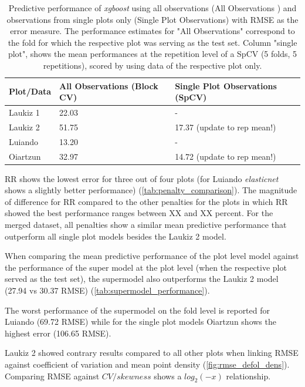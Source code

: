\documentclass[review]{elsarticle}
\begin{document}
\begin{table}[t!]
\centering
\caption[t]{Predictive performance of \textit{xgboost} using all observations (All Observations ) and observations from single plots only (Single Plot Observations) with \ac{RMSE} as the error measure. The performance estimates for "All Observations" correspond to the fold for which the respective plot was serving as the test set. Column "single plot", shows the mean performances at the repetition level of a SpCV (5 folds, 5 repetitions), scored by using data of the respective plot only.}
\begingroup\footnotesize
\begin{tabular}{lll}
	\\
	Plot/Data & All Observations (Block CV) & Single Plot Observations (SpCV)             \\
	\hline
	Laukiz 1  & 22.03                & -                              \\
	Laukiz 2  & 51.75                & 17.37  (update to rep mean!)   \\
	Luiando   & 13.20                & -                              \\
	Oiartzun  & 32.97                & 14.72    (update to rep mean!) \\
	\bottomrule
\end{tabular}
\endgroup
\label{tab:supermodel_performance}
\end{table}

\ac{RR} shows the lowest error for three out of four plots (for Luiando \textit{elasticnet} shows a slightly better performance) (\autoref{tab:penalty_comparison}).
The magnitude of difference for \ac{RR} compared to the other penalties for the plots in which \ac{RR} showed the best performance ranges between XX and XX percent.
For the merged dataset, all penalties show a similar mean predictive performance that outperform all single plot models besides the Laukiz 2 model.

When comparing the mean predictive performance of the plot level model against the performance of the super model at the plot level (when the respective plot served as the test set), the supermodel also outperforms the Laukiz 2 model (27.94 vs 30.37 RMSE) (\autoref{tab:supermodel_performance}).

The worst performance of the supermodel on the fold level is reported for Luiando (69.72 RMSE) while for the single plot models Oiartzun shows the highest error (106.65 RMSE).

Laukiz 2 showed contrary results compared to all other plots when linking \ac{RMSE} against coefficient of variation and mean point density (\autoref{fig:rmse_defol_dens}).
Comparing RMSE against $CV/skewness$ shows a $log_{2}(-x)$ relationship.
\end{document}
